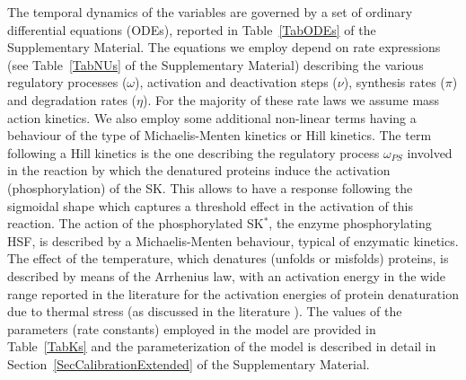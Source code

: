 \documentclass[oneside, 10pt, a4paper, twocolumn]{article}
\begin{document}
The temporal dynamics of the variables are governed by a set of ordinary differential equations (ODEs),
reported in Table~\ref{TabODEs} of the Supplementary Material. 
The equations we employ depend on rate expressions (see Table~\ref{TabNUs} of the Supplementary Material) describing the various regulatory processes ($\omega$), activation and deactivation steps ($\nu$), synthesis rates ($\pi$) and
degradation rates ($\eta$). 
For the majority of these rate laws we assume mass action kinetics. We also employ some additional non-linear terms having a behaviour of the type of Michaelis-Menten kinetics or Hill kinetics.  %
The term following a Hill kinetics is the one describing the regulatory process $\omega_{PS}$ involved in the reaction by which the denatured proteins induce the activation (phosphorylation) of the SK. {This allows to have a response following the sigmoidal shape which captures} a threshold effect in the activation of this reaction. 
The action of the phosphorylated SK$^*$, the enzyme phosphorylating HSF, is described by a Michaelis-Menten behaviour, typical of enzymatic kinetics. 
The effect of the temperature, which denatures (unfolds or misfolds) proteins, is described by means of the Arrhenius law, with an activation energy 
in the wide range reported in the literature for the activation energies of protein denaturation due to thermal stress (as discussed in the literature \cite{Bischof2006,He2003}). 
The values of the parameters (rate constants) employed in the model are provided in Table~\ref{TabKs} and the parameterization of the model is described in detail in Section~\ref{SecCalibrationExtended} of the Supplementary Material.
\end{document}
